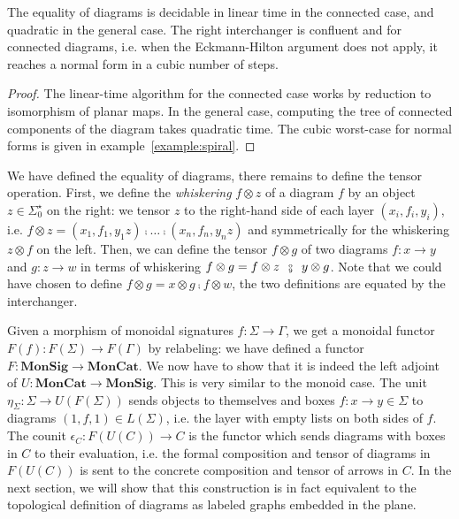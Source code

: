 \begin{theorem}
\label{theorem:monoidal-normal-form}
The equality of diagrams is decidable in linear time in the connected case, and quadratic in the general case.
The right interchanger is confluent and for connected diagrams, i.e. when the Eckmann-Hilton argument does not apply, it reaches a normal form in a cubic number of steps.
\end{theorem}

\begin{proof}
The linear-time algorithm for the connected case works by reduction to isomorphism of planar maps.
In the general case, computing the tree of connected components of the diagram takes quadratic time.
The cubic worst-case for normal forms is given in example~\ref{example:spiral}.
\end{proof}

We have defined the equality of diagrams, there remains to define the tensor operation.
First, we define the \emph{whiskering} $f \otimes z$ of a diagram $f$ by an object $z \in \Sigma_0^\star$ on the right: we tensor $z$ to the right-hand side of each layer $(x_i, f_i, y_i)$, i.e. $f \otimes z = (x_1, f_1, y_1 z) \fcmp \dots \fcmp (x_n, f_n, y_n z)$ and symmetrically for the whiskering $z \otimes f$ on the left.
Then, we can define the tensor $f \otimes g$ of two diagrams $f : x \to y$ and $g : z \to w$ in terms of whiskering $f \otimes g = f \otimes z \s \fcmp \s y \otimes g$.
Note that we could have chosen to define $f \otimes g = x \otimes g \fcmp f \otimes w$, the two definitions are equated by the interchanger.

Given a morphism of monoidal signatures $f : \Sigma \to \Gamma$, we get a monoidal functor $F(f) : F(\Sigma) \to F(\Gamma)$ by relabeling: we have defined a functor $F : \mathbf{MonSig} \to \mathbf{MonCat}$.
We now have to show that it is indeed the left adjoint of $U : \mathbf{MonCat} \to \mathbf{MonSig}$.
This is very similar to the monoid case.
The unit $\eta_\Sigma : \Sigma \to U(F(\Sigma))$ sends objects to themselves and boxes $f : x \to y \in \Sigma$ to diagrams $(1, f, 1) \in L(\Sigma)$, i.e. the layer with empty lists on both sides of $f$.
The counit $\epsilon_C : F(U(C)) \to C$ is the functor which sends diagrams with boxes in $C$ to their evaluation, i.e. the formal composition and tensor of diagrams in $F(U(C))$ is sent to the concrete composition and tensor of arrows in $C$.
In the next section, we will show that this construction is in fact equivalent to the topological definition of diagrams as labeled graphs embedded in the plane.

